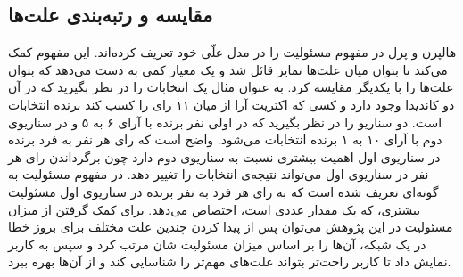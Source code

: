 \subsection{مقایسه و رتبه‌بندی علت‌ها}
هالپرن و پرل در 
\cite{hp2}
مفهوم مسئولیت%
را در مدل علّی خود تعریف کرده‌اند.
این مفهوم کمک می‌کند تا بتوان میان علت‌ها تمایز قائل شد و یک معیار کمی به دست می‌دهد که بتوان علت‌ها را با یکدیگر مقایسه کرد.
به عنوان مثال یک انتخابات را در نظر بگیرید که در آن دو کاندیدا وجود دارد و کسی که اکثریت آرا از میان ۱۱ رای را کسب کند برنده انتخابات است. 
دو سناریو را در نظر بگیرید که در اولی نفر برنده با آرای ۶ به ۵ و در سناریوی دوم با آرای ۱۰ به ۱ برنده انتخابات می‌شود.
واضح است که رای هر نفر به فرد برنده در سناریوی اول اهمیت بیشتری نسبت به سناریوی دوم دارد چون برگرداندن رای هر نفر در سناریوی اول می‌تواند نتیجه‌ی انتخابات را تغییر دهد.
در
\cite{hp2}
مفهوم مسئولیت به گونه‌ای تعریف شده است که به رای هر فرد به نفر برنده در سناریوی‌ اول مسئولیت بیشتری، که یک مقدار عددی است، 
اختصاص می‌دهد.
برای کمک گرفتن از میزان مسئولیت در این پژوهش می‌توان پس از پیدا کردن چندین علت مختلف برای بروز خطا در یک شبکه، آن‌ها را بر اساس میزان مسئولیت شان مرتب کرد و سپس به کاربر نمایش داد تا کاربر راحت‌تر بتواند علت‌های مهم‌تر را شناسایی کند و از آن‌ها بهره ببرد.